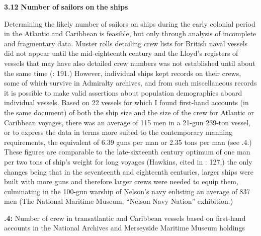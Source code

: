 \textbf{3.12} \textbf{Number} \textbf{of} \textbf{sailors} \textbf{on} \textbf{the} \textbf{ships}

  Determining the likely number of sailors on ships during the early colonial period in the Atlantic and Caribbean is feasible, but only through analysis of incomplete and fragmentary data. Muster rolls detailing crew lists for British naval vessels did not appear until the mid-eighteenth century \citep[125]{Litter1999} and the Lloyd’s registers of vessels that may have also detailed crew numbers was not established until about the same time (\citealt{Litter1999}: 191.) However, individual ships kept records on their crews, some of which survive in Admiralty archives, and from such miscellaneous records it is possible to make valid assertions about population demographics aboard individual vessels. Based on 22 vessels for which I found first-hand accounts (in the same document) of both the ship size and the size of the crew for Atlantic or Caribbean voyages, there was an average of 115 men in a 21-gun 239-ton vessel, or to express the data in terms more suited to the contemporary manning requirements, the equivalent of 6.39 guns per man or 2.35 tons per man (see .4.) These figures are comparable to the late-sixteenth century optimum of one man per two tons of ship’s weight for long voyages (Hawkins, cited in \citealt{Bicheno2012}: 127,) the only changes being that in the seventeenth and eighteenth centuries, larger ships were built with more guns and therefore larger crews were needed to equip them, culminating in the 100-gun warship of Nelson’s navy enlisting an average of 837 men (The National Maritime Museum, “Nelson Navy Nation” exhibition.)

\textbf{.4:} Number of crew in transatlantic and Caribbean vessels based on first-hand accounts in the National Archives and Merseyside Maritime Museum holdings

\tablefirsthead{}


